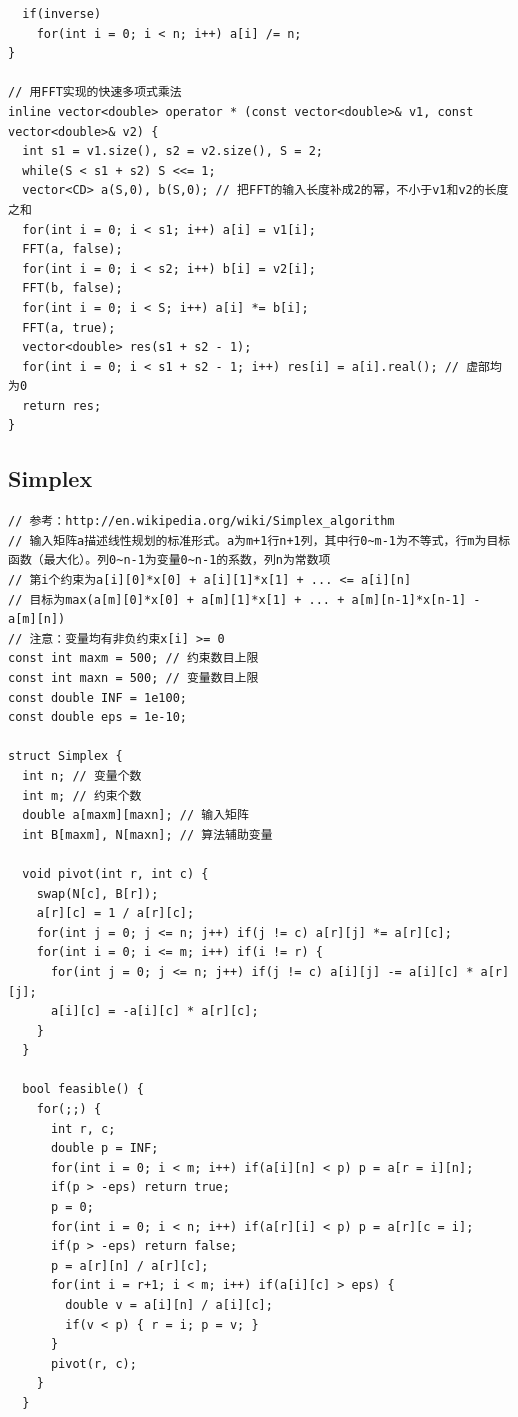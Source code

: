 \documentclass[10pt,landscape]{article}
\begin{document}
\begin{multicols}{2}
\begin{lstlisting}
  if(inverse)
    for(int i = 0; i < n; i++) a[i] /= n;
}

// 用FFT实现的快速多项式乘法
inline vector<double> operator * (const vector<double>& v1, const vector<double>& v2) {
  int s1 = v1.size(), s2 = v2.size(), S = 2;
  while(S < s1 + s2) S <<= 1;
  vector<CD> a(S,0), b(S,0); // 把FFT的输入长度补成2的幂，不小于v1和v2的长度之和
  for(int i = 0; i < s1; i++) a[i] = v1[i];
  FFT(a, false);
  for(int i = 0; i < s2; i++) b[i] = v2[i];
  FFT(b, false);
  for(int i = 0; i < S; i++) a[i] *= b[i];
  FFT(a, true);
  vector<double> res(s1 + s2 - 1);
  for(int i = 0; i < s1 + s2 - 1; i++) res[i] = a[i].real(); // 虚部均为0
  return res;
}
\end{lstlisting}

\subsection{Simplex}
\begin{lstlisting}
// 参考：http://en.wikipedia.org/wiki/Simplex_algorithm
// 输入矩阵a描述线性规划的标准形式。a为m+1行n+1列，其中行0~m-1为不等式，行m为目标函数（最大化）。列0~n-1为变量0~n-1的系数，列n为常数项
// 第i个约束为a[i][0]*x[0] + a[i][1]*x[1] + ... <= a[i][n]
// 目标为max(a[m][0]*x[0] + a[m][1]*x[1] + ... + a[m][n-1]*x[n-1] - a[m][n])
// 注意：变量均有非负约束x[i] >= 0
const int maxm = 500; // 约束数目上限
const int maxn = 500; // 变量数目上限
const double INF = 1e100;
const double eps = 1e-10;

struct Simplex {
  int n; // 变量个数
  int m; // 约束个数
  double a[maxm][maxn]; // 输入矩阵
  int B[maxm], N[maxn]; // 算法辅助变量

  void pivot(int r, int c) {
    swap(N[c], B[r]);
    a[r][c] = 1 / a[r][c];
    for(int j = 0; j <= n; j++) if(j != c) a[r][j] *= a[r][c];
    for(int i = 0; i <= m; i++) if(i != r) {
      for(int j = 0; j <= n; j++) if(j != c) a[i][j] -= a[i][c] * a[r][j];
      a[i][c] = -a[i][c] * a[r][c];
    }
  }

  bool feasible() {
    for(;;) {
      int r, c;
      double p = INF;
      for(int i = 0; i < m; i++) if(a[i][n] < p) p = a[r = i][n];
      if(p > -eps) return true;
      p = 0;
      for(int i = 0; i < n; i++) if(a[r][i] < p) p = a[r][c = i];
      if(p > -eps) return false;
      p = a[r][n] / a[r][c];
      for(int i = r+1; i < m; i++) if(a[i][c] > eps) {
        double v = a[i][n] / a[i][c];
        if(v < p) { r = i; p = v; }
      }
      pivot(r, c);
    }
  }


\end{lstlisting}
\end{multicols}
\end{document}
